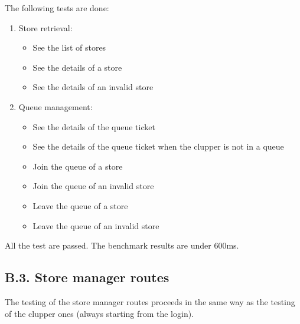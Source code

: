 The following tests are done:
\begin{enumerate}
    \item Store retrieval:
        \begin{itemize}
            \item See the list of stores
            \item See the details of a store
            \item See the details of an invalid store
        \end{itemize}
    \clearpage
    \item Queue management:
        \begin{itemize}
            \item See the details of the queue ticket
            \item See the details of the queue ticket when the clupper is not in a queue
            \item Join the queue of a store
            \item Join the queue of an invalid store
            \item Leave the queue of a store
            \item Leave the queue of an invalid store
        \end{itemize}
\end{enumerate}

All the test are passed. The benchmark results are under 600ms.

\subsection{B.3. Store manager routes}

The testing of the store manager routes proceeds in the same way as the testing of the clupper ones (always starting from the login).

